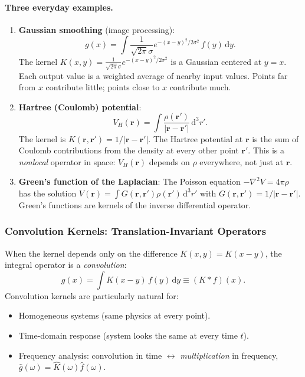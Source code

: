\documentclass[12pt,letterpaper]{article}
\newcommand{\dd}{\mathrm{d}}
\theoremstyle{definition}
\begin{document}
\paragraph{Three everyday examples.}
\begin{enumerate}
  \item \textbf{Gaussian smoothing} (image processing):
    \begin{equation}
      g(x) = \int \frac{1}{\sqrt{2\pi}\sigma}
      e^{-(x-y)^2/2\sigma^2}\,f(y)\,\dd y.
      \label{eq:gaussian_kernel}
    \end{equation}
    The kernel $K(x,y) = \frac{1}{\sqrt{2\pi}\sigma}e^{-(x-y)^2/2\sigma^2}$
    is a Gaussian centered at $y=x$.  Each output value is a weighted
    average of nearby input values.  Points far from $x$ contribute
    little; points close to $x$ contribute much.

  \item \textbf{Hartree (Coulomb) potential}:
    \begin{equation}
      V_H(\bm{r}) = \int \frac{\rho(\bm{r}')}{|\bm{r}-\bm{r}'|}\,\dd^3r'.
      \label{eq:hartree_kernel}
    \end{equation}
    The kernel is $K(\bm{r},\bm{r}') = 1/|\bm{r}-\bm{r}'|$.
    The Hartree potential at $\bm{r}$ is the sum of Coulomb contributions
    from the density at every other point $\bm{r}'$.  This is a
    \emph{nonlocal} operator in space: $V_H(\bm{r})$ depends on $\rho$
    everywhere, not just at $\bm{r}$.

  \item \textbf{Green's function of the Laplacian}:
    The Poisson equation $-\nabla^2 V = 4\pi\rho$ has the solution
    $V(\bm{r}) = \int G(\bm{r},\bm{r}')\rho(\bm{r}')\,\dd^3r'$
    with $G(\bm{r},\bm{r}') = 1/|\bm{r}-\bm{r}'|$.
    Green's functions are kernels of the inverse differential operator.
\end{enumerate}

\subsubsection{Convolution Kernels: Translation-Invariant Operators}

When the kernel depends only on the difference $K(x,y)=K(x-y)$, the
integral operator is a \emph{convolution}:
\begin{equation}
  g(x) = \int K(x-y)\,f(y)\,\dd y \equiv (K*f)(x).
  \label{eq:convolution}
\end{equation}
Convolution kernels are particularly natural for:
\begin{itemize}[noitemsep]
  \item Homogeneous systems (same physics at every point).
  \item Time-domain response (system looks the same at every time $t$).
  \item Frequency analysis: convolution in time $\leftrightarrow$
    \emph{multiplication} in frequency, $\hat{g}(\omega) = \hat{K}(\omega)\hat{f}(\omega)$.
\end{itemize}
\end{document}
